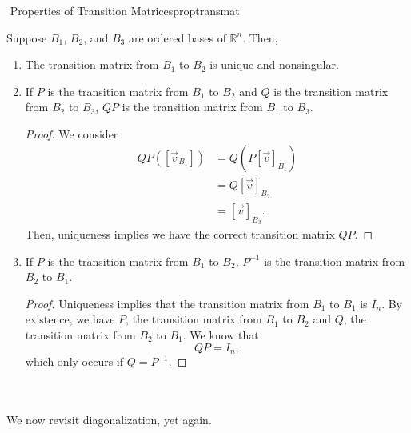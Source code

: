         \begin{theorem}{\Stop\,\,Properties of Transition Matrices}{proptransmat}

            Suppose \(B_1\), \(B_2\), and \(B_3\) are ordered bases of \(\mathbb{R}^n\). Then,
            \begin{enumerate}
                \item The transition matrix from \(B_1\) to \(B_2\) is unique and nonsingular.
                \item If \(P\) is the transition matrix from \(B_1\) to \(B_2\) and \(Q\) is the transition matrix from \(B_2\) to \(B_3\), \(QP\) is the transition matrix from \(B_1\) to \(B_3\).
                \begin{proof}
                    We consider 
                    \begin{align*}
                        QP([\vec{v}_{B_1}])&=Q(P[\vec{v}]_{B_1}) \\
                        &=Q[\vec{v}]_{B_2} \\
                        &=[\vec{v}]_{B_3}.
                    \end{align*}
                    Then, uniqueness implies we have the correct transition matrix \(QP\).
                \end{proof}
                \item If \(P\) is the transition matrix from \(B_1\) to \(B_2\), \(P^{-1}\) is the transition matrix from \(B_2\) to \(B_1\).
                \begin{proof}
                    Uniqueness implies that the transition matrix from \(B_1\) to \(B_1\) is \(I_n\). By existence, we have \(P\), the transition matrix from \(B_1\) to \(B_2\) and \(Q\), the transition matrix from \(B_2\) to \(B_1\). We know that
                    \begin{equation*}
                        QP=I_n,
                    \end{equation*}
                    which only occurs if \(Q=P^{-1}\).
                \end{proof}
            \end{enumerate}
            
        \end{theorem}
        \pagebreak
        \vphantom
        \\
        \\
        We now revisit diagonalization, yet again.
